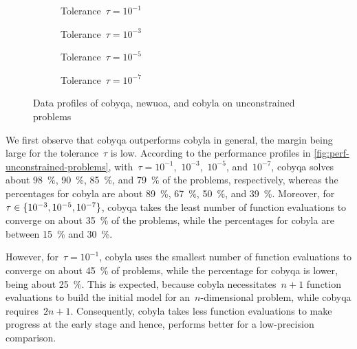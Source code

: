 \begin{figure}[ht]
    \centering
    \begin{subfigure}[b]{0.49\textwidth}
        \centering
        \caption{Tolerance~$\tau = 10^{-1}$}
    \end{subfigure}
    \hfill
    \begin{subfigure}[b]{0.49\textwidth}
        \centering
        \caption{Tolerance~$\tau = 10^{-3}$}
    \end{subfigure}
    \begin{subfigure}[b]{0.49\textwidth}
        \centering
        \caption{Tolerance~$\tau = 10^{-5}$}
    \end{subfigure}
    \hfill
    \begin{subfigure}[b]{0.49\textwidth}
        \centering
        \caption{Tolerance~$\tau = 10^{-7}$}
    \end{subfigure}
    \caption[Data profiles on unconstrained problems]{Data profiles of \gls{cobyqa}, \gls{newuoa}, and \gls{cobyla} on unconstrained problems}
    \label{fig:data-unconstrained-problems}
\end{figure}

We first observe that \gls{cobyqa} outperforms \gls{cobyla} in general, the margin being large for the tolerance~$\tau$ is low.
According to the performance profiles in \cref{fig:perf-unconstrained-problems}, with~$\tau = 10^{-1}$,~$10^{-3}$,~$10^{-5}$, and~$10^{-7}$, \gls{cobyqa} solves about \SI{98}{\percent}, \SI{90}{\percent}, \SI{85}{\percent}, and \SI{79}{\percent} of the problems, respectively, whereas the percentages for \gls{cobyla} are about \SI{89}{\percent}, \SI{67}{\percent}, \SI{50}{\percent}, and \SI{39}{\percent}.
Moreover, for~$\tau \in \{10^{-3}, 10^{-5}, 10^{-7}\}$, \gls{cobyqa} takes the least number of function evaluations to converge on about \SI{35}{\percent} of the problems, while the percentages for \gls{cobyla} are between \SI{15}{\percent} and \SI{30}{\percent}. 

However, for~$\tau = 10^{-1}$, \gls{cobyla} uses the smallest number of function evaluations to converge on about \SI{45}{\percent} of problems, while the percentage for \gls{cobyqa} is lower, being about \SI{25}{\percent}.
This is expected, because \gls{cobyla} necessitates~$n + 1$ function evaluations to build the initial model for an~$n$-dimensional problem, while \gls{cobyqa} requires~$2n + 1$.
Consequently, \gls{cobyla} takes less function evaluations to make progress at the early stage and hence, performs better for a low-precision comparison.

